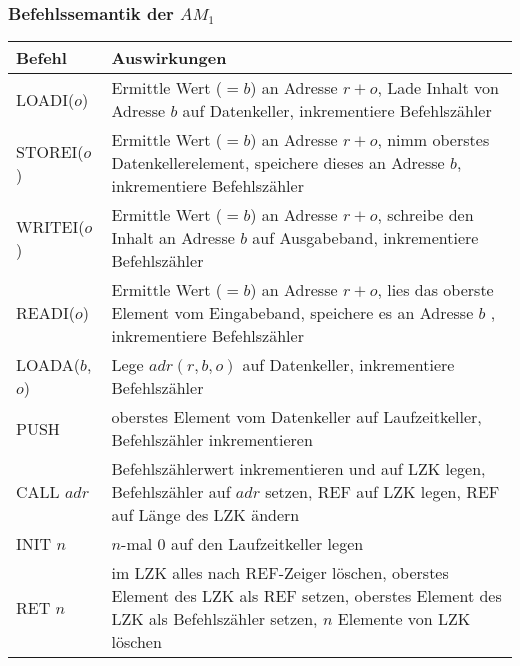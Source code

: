 \documentclass[aspectratio=1610,onlymath, ngerman]{beamer}
\renewcommand{\emph}[1]{\textbf{#1}}
\begin{document}
	\begin{frame} \frametitle{Befehlssemantik der $AM_1$}
		\begin{tabular}{p{2cm} p{\dimexpr\linewidth-\fboxrule-\fboxsep-2cm}}
			\emph{Befehl} & \emph{Auswirkungen}  \\ \hline
			LOADI($o$) & Ermittle Wert ($=b$) an Adresse $r+o$, Lade Inhalt
			von Adresse $b$ auf Datenkeller, inkrementiere Befehlszähler \\
			STOREI($o$) & Ermittle Wert ($=b$) an Adresse $r+o$, nimm
			oberstes Datenkellerelement, speichere dieses an
			Adresse $b$, inkrementiere Befehlszähler \\
			WRITEI($o$) & Ermittle Wert ($=b$) an Adresse $r+o$, schreibe den
			Inhalt an Adresse $b$ auf Ausgabeband, inkrementiere Befehlszähler \\
			READI($o$) & Ermittle Wert ($=b$) an Adresse $r+o$, lies das oberste
			Element vom Eingabeband, speichere es an Adresse $b$ , inkrementiere Befehlszähler \\
			LOADA($b$,$o$) & Lege $adr(r,b,o)$ auf Datenkeller, inkrementiere Befehlszähler \\			
			PUSH & oberstes Element vom Datenkeller auf Laufzeitkeller, Befehlszähler inkrementieren \\
			CALL $adr$ & Befehlszählerwert inkrementieren und auf LZK legen, Befehlszähler auf $adr$ setzen, REF auf LZK legen, REF auf Länge des LZK ändern \\
			INIT $n$ & $n$-mal $0$ auf den Laufzeitkeller legen \\
			RET $n$ & im LZK alles nach REF-Zeiger löschen, oberstes Element des LZK als REF setzen, oberstes Element des LZK als Befehlszähler setzen, $n$ Elemente von LZK löschen
		\end{tabular}
	\end{frame}
\end{document}
